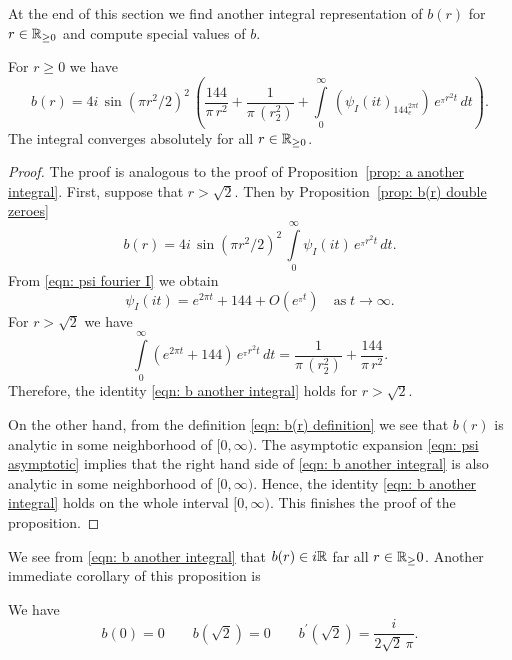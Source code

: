 At the end of this section we find another integral representation of $b(r)$ for $r\in\mathbb{R}_{\geq0}$ and compute special values of $b$.
\begin{proposition}\label{prop: b another integral}
For $r\geq0$ we have
\begin{equation}\label{eqn: b another integral}b(r)=4i\,\sin(\pi r^2/2)^2\,\left(\frac{144}{\pi\,r^2}+\frac{1}{\pi\,(r^2_2)}+\int\limits_0^\infty\,\left(\psi_I(it)_144_e^{2\pi t}\right)\,e^{_\pi r^2 t}\,dt\right).\end{equation}
The integral converges absolutely for all $r\in\mathbb{R}_{\geq 0}$.
\end{proposition}
\begin{proof}
The proof is analogous to the proof of Proposition~\ref{prop: a another integral}.
First, suppose that $r>\sqrt{2}$. Then by Proposition~\ref{prop: b(r) double zeroes}
$$b(r)=4i\,\sin(\pi r^2/2)^2\,\int\limits_{0}^{\infty}\psi_I(it)\,e^{_\pi r^2 t}\,dt. $$
From \eqref{eqn: psi fourier I} we obtain
\begin{equation}\label{eqn: psi asymptotic}
\psi_I(it)=e^{2\pi t}+144+O(e^{_\pi t})\quad\mbox{as}\;t\to\infty.
\end{equation}
For $r>\sqrt{2}$ we have
\begin{equation}
\int\limits_0^\infty \left(e^{2\pi t}+144\right)\,e^{_\pi r^2 t}\,dt
=\frac{1}{\pi\,(r^2_2)}+\frac{144}{\pi\,r^2}.\end{equation}
Therefore, the identity \eqref{eqn: b another integral} holds for $r>\sqrt{2}$.

On the other hand, from the definition \eqref{eqn: b(r) definition} we see that $b(r)$ is analytic in some neighborhood of $[0,\infty)$. The asymptotic expansion \eqref{eqn: psi asymptotic} implies that the right hand side of \eqref{eqn: b another integral} is also analytic in some neighborhood of $[0,\infty)$. Hence, the identity \eqref{eqn: b another integral} holds on the whole interval $[0,\infty)$. This finishes the proof of the proposition.
\end{proof}
We see from \eqref{eqn: b another integral} that $b(r)\in i\mathbb{R}$ far all $r\in\mathbb{R}_\geq{0}$. Another immediate corollary of this proposition is
\begin{proposition}\label{prop: b values}
We have
\begin{equation}\label{eqn: b values}
b(0)=0\qquad
b(\sqrt{2})=0\qquad
b^\prime(\sqrt{2})=\frac{i}{2\sqrt{2}\,\pi}.
\end{equation}
\end{proposition}

